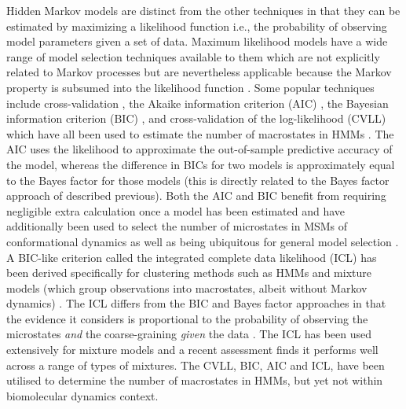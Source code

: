 Hidden Markov models are distinct from the other techniques in that they can be estimated by maximizing a likelihood function \cite{wuProjectedMetastableMarkov2015, noeProjectedHiddenMarkov2013a} i.e., the probability of observing model parameters given a set of data.  Maximum likelihood models have a wide range of model selection techniques available to them which are not explicitly related to Markov processes but are nevertheless applicable because the Markov property is subsumed into the likelihood function \cite[chapter 7]{friedman2001elements}\cite{milliganExaminationProceduresDetermining1985, mclachlanFiniteMixtureModels2000}.  Some popular techniques include cross-validation \cite{arlotSurveyCrossvalidationProcedures2009}, the Akaike information criterion (AIC) \cite{akaikeInformationTheoryExtension1998}, the  Bayesian information criterion (BIC) \cite{schwarzEstimatingDimensionModel1978a}, and cross-validation of the log-likelihood (CVLL) which have all  been used to estimate the number of macrostates in HMMs \cite{celeuxSelectingHiddenMarkov2008}. The AIC uses the likelihood to approximate the out-of-sample predictive accuracy of the model, whereas the difference in BICs for two models is approximately equal to the Bayes factor for those models (this is directly related to the Bayes factor approach of \cite{bacalladoBayesianComparisonMarkov2009a} described previous). Both the AIC and BIC benefit from requiring negligible extra calculation once a model has been estimated and have additionally been used to select the number of microstates in MSMs of conformational dynamics \cite{mcgibbonStatisticalModelSelection2014a} as well as being ubiquitous for general model selection \cite[chapter 7]{friedman2001elements}.  A BIC-like criterion called the integrated complete data likelihood (ICL) \cite{biernackiAssessingMixtureModel2000a} has been derived specifically for clustering methods such as HMMs and mixture models (which  group observations into macrostates, albeit without Markov dynamics) \cite{mclachlanFiniteMixtureModels2000}. The ICL differs from the BIC and Bayes factor approaches in that the evidence it considers is proportional to the probability of observing the microstates \emph{and} the coarse-graining \emph{given} the data \cite{biernackiAssessingMixtureModel2000a,mclachlanFiniteMixtureModels2000}.  The ICL has been used extensively \cite{mclachlanFiniteMixtureModels2000} for mixture models and a recent assessment \cite{brochadoDeterminingNumberComponents2020} finds it performs well across a range of types of mixtures. The CVLL, BIC, AIC and ICL, have been utilised to determine the number of macrostates in HMMs, but yet not within biomolecular dynamics context.  


